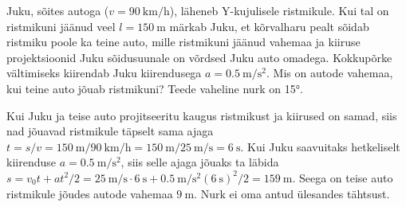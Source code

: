 
Juku, sõites autoga ($v = \SI{90}{\kilo\meter\per\hour}$), läheneb Y-kujulisele ristmikule. Kui tal on ristmikuni jäänud veel $l = \SI{150}{\meter}$ märkab Juku, et kõrvalharu pealt sõidab ristmiku poole ka teine auto, mille ristmikuni jäänud vahemaa ja kiiruse projektsioonid Juku sõidusuunale on võrdsed Juku auto omadega. Kokkupõrke vältimiseks kiirendab Juku kiirendusega $a = \SI{0.5}{\meter\per\second\squared}$. Mis on autode vahemaa, kui teine auto jõuab ristmikuni? Teede vaheline nurk on \ang{15}.


\hint

\solu
Kui Juku ja teise auto projitseeritu kaugus ristmikust ja kiirused on samad, siis nad jõuavad ristmikule täpselt sama ajaga $t = s/v = \SI{150}{\meter} / \SI{90}{\kilo\meter\per\hour} = \SI{150}{\meter} / \SI{25}{\meter\per\second} = \SI{6}{\second}$. Kui Juku saavuitaks hetkeliselt kiirenduse $a = \SI{0.5}{\meter\per\second\squared}$, siis selle ajaga jõuaks ta läbida $s = v_0 t + a t^2/2 = \SI{25}{\meter\per\second} \cdot \SI{6}{\second} + \SI{0.5}{\meter\per\second\squared} (\SI{6}{\second})^2 / 2 = \SI{159}{\meter}$. Seega on teise auto ristmikule jõudes autode vahemaa $\SI{9}{\meter}$. Nurk ei oma antud ülesandes tähtsust.
\probend